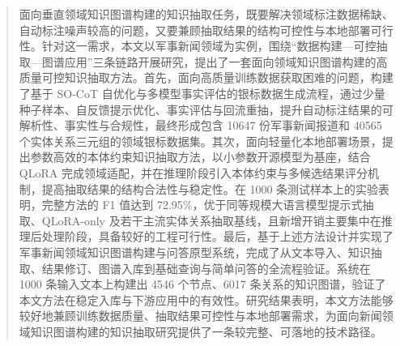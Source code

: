 
\begin{abstract}
  面向垂直领域知识图谱构建的知识抽取任务，既要解决领域标注数据稀缺、自动标注噪声较高的问题，又要兼顾抽取结果的结构可控性与本地部署可行性。针对这一需求，本文以军事新闻领域为实例，围绕“数据构建—可控抽取—图谱应用”三条链路开展研究，提出了一套面向领域知识图谱构建的高质量可控知识抽取方法。首先，面向高质量训练数据获取困难的问题，构建了基于 SO-CoT 自优化与多模型事实评估的银标数据生成流程，通过少量种子样本、自反馈提示优化、事实评估与回流重抽，提升自动标注结果的可解析性、事实性与合规性，最终形成包含 10647 份军事新闻报道和 40565 个实体关系三元组的领域银标数据集。其次，面向轻量化本地部署场景，提出参数高效的本体约束知识抽取方法，以小参数开源模型为基座，结合 QLoRA 完成领域适配，并在推理阶段引入本体约束与多候选结果评分机制，提高抽取结果的结构合法性与稳定性。在 1000 条测试样本上的实验表明，完整方法的 F1 值达到 72.95\%，优于同等规模大语言模型提示式抽取、QLoRA-only 及若干主流实体关系抽取基线，且新增开销主要集中在推理后处理阶段，具备较好的工程可行性。最后，基于上述方法设计并实现了军事新闻领域知识图谱构建与问答原型系统，完成了从文本导入、知识抽取、结果修订、图谱入库到基础查询与简单问答的全流程验证。系统在 1000 条输入文本上构建出 4546 个节点、6017 条关系的知识图谱，验证了本文方法在稳定入库与下游应用中的有效性。研究结果表明，本文方法能够较好地兼顾训练数据质量、抽取结果可控性与本地部署需求，为面向新闻领域知识图谱构建的知识抽取研究提供了一条较完整、可落地的技术路径。
\end{abstract}


